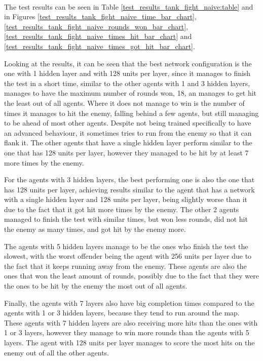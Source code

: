 \paragraph{}
The test results can be seen in Table \ref{test_results_tank_fight_naive:table} and in Figures \ref{test_results_tank_fight_naive_time_bar_chart}, \ref{test_results_tank_fight_naive_rounds_won_bar_chart}, \ref{test_results_tank_fight_naive_times_hit_bar_chart} and \ref{test_results_tank_fight_naive_times_got_hit_bar_chart}.

Looking at the results, it can be seen that the best network configuration is the one with 1 hidden layer and with 128 units per layer, since it manages to finish the test in a short time, similar to the other agents with 1 and 3 hidden layers, manages to have the maximum number of rounds won, 18, an manages to get hit the least out of all agents. Where it does not manage to win is the number of times it manages to hit the enemy, falling behind a few agents, but still managing to be ahead of most other agents. Despite not being trained specifically to have an advanced behaviour, it sometimes tries to run from the enemy so that it can flank it. The other agents that have a single hidden layer perform similar to the one that has 128 units per layer, however they managed to be hit by at least 7 more times by the enemy.

For the agents with 3 hidden layers, the best performing one is also the one that has 128 units per layer, achieving results similar to the agent that has a network with a single hidden layer and 128 units per layer, being slightly worse than it due to the fact that it got hit more times by the enemy. The other 2 agents managed to finish the test with similar times, but won less rounds, did not hit the enemy as many times, and got hit by the enemy more.

The agents with 5 hidden layers manage to be the ones who finish the test the slowest, with the worst offender being the agent with 256 units per layer due to the fact that it keeps running away from the enemy. These agents are also the ones that won the least amount of rounds, possibly due to the fact that they were the ones to be hit by the enemy the most out of all agents.

Finally, the agents with 7 layers also have big completion times compared to the agents with 1 or 3 hidden layers, because they tend to run around the map. These agents with 7 hidden layers are also receiving more hits than the ones with 1 or 3 layers, however they manage to win more rounds than the agents with 5 layers. The agent with 128 units per layer manages to score the most hits on the enemy out of all the other agents.

